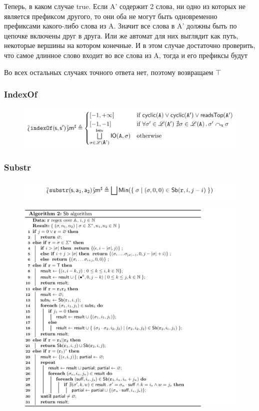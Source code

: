 Теперь, в каком случае true. Если A' содержит 2 слова, ни одно из которых не является префиксом другого, то они оба не могут быть одновременно префиксами какого-либо слова из A. Значит все слова в A' должны быть по цепочке включены друг в друга. Или же автомат для них выглядит как путь, некоторые вершины на котором конечные. И в этом случае достаточно проверить, что самое длинное слово входит во все слова из A, тогда и его префиксы будут

Во всех остальных случаях точного ответа нет, поэтому возвращаем $\top$

\newpage
\subsubsection*{IndexOf}

\begin{figure}[H]
\includegraphics[width=\textwidth]{images/tarsis-indexOf.png}\hfill
\end{figure}

\newpage
\subsubsection*{Substr}
\begin{figure}[H]
\includegraphics[width=\textwidth]{images/tarsis-substr.png}\hfill
\end{figure}

\begin{figure}[H]
\includegraphics[width=\textwidth]{images/tarsis-SB-algo.png}\hfill
\end{figure}


